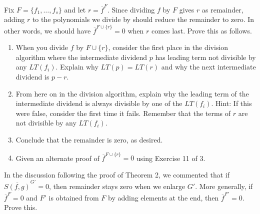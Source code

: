 \begin{tcolorbox}[title=Problem 12, breakable]
    Fix $F = \{f_1, \ldots, f_s\}$ and let $r = \overline{f}^F$.
    Since dividing $f$ by $F$ gives $r$ as remainder, adding $r$
    to the polynomials we divide by should reduce the remainder 
    to zero. In other words, we should have 
    $\overline{f}^{F \cup \{r\}} = 0$ when $r$ comes last. Prove this as follows.
    \begin{enumerate}
        \item When you divide $f$ by $F \cup \{r\}$, consider the first place 
        in the division algorithm where the intermediate dividend $p$ has leading 
        term not divisible by any $LT(f_i)$. Explain why $LT(p) = LT(r)$ and 
        why the next intermediate dividend is $p - r$.
        \item From here on in the division algorithm, explain why the leading term 
        of the intermediate dividend is always divisible by one of the 
        $LT(f_i)$. Hint: If this were false, consider the first time it fails.
        Remember that the terms of $r$ are not divisible by any $LT(f_i)$.
        \item Conclude that the remainder is zero, as desired.
        \item Given an alternate proof of $\overline{f}^{F \cup \{r\}} = 0$ using 
        Exercise 11 of 3.
    \end{enumerate}
\end{tcolorbox}

\begin{tcolorbox}[title=Problem 13, breakable]
    In the discussion following the proof of Theorem 2, we commented that 
    if $\overline{S(f, g)}^{G'} = 0$, then remainder stays zero when we enlarge $G'$.
    More generally, if $\overline{f}^F = 0$ and $F'$ is obtained from $F$
    by adding elements at the end, then $\overline{f}^{F'} = 0$. Prove this.
\end{tcolorbox}

